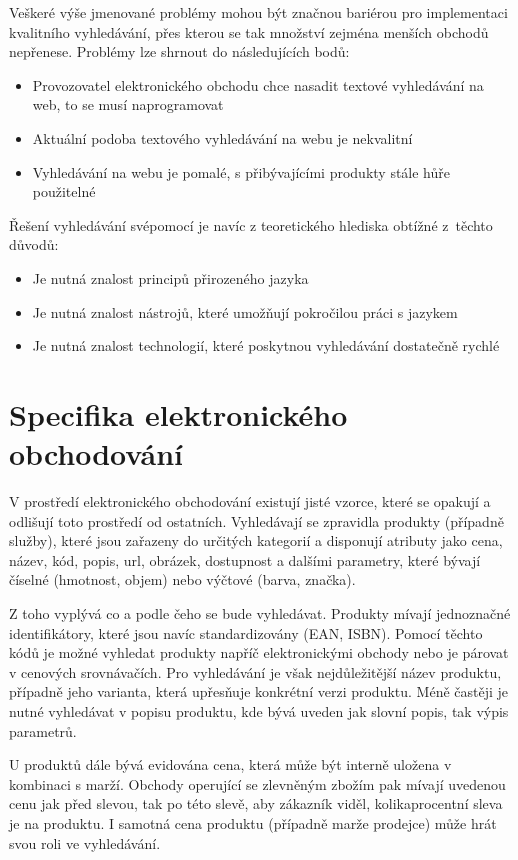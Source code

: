 \documentclass[FM,DP]{tulthesis}
\begin{document}
Veškeré výše jmenované problémy mohou být značnou bariérou pro implementaci kvalitního vyhledávání, 
přes kterou se tak množství zejména menších obchodů nepřenese. Problémy lze shrnout do následujících bodů:

\begin{itemize}
\item Provozovatel elektronického obchodu chce nasadit textové vyhledávání na web, to se musí naprogramovat
\item Aktuální podoba textového vyhledávání na webu je nekvalitní
\item Vyhledávání na webu je pomalé, s přibývajícími produkty stále hůře použitelné
\end{itemize}

Řešení vyhledávání svépomocí je navíc z teoretického hlediska obtížné z~těchto důvodů:

\begin{itemize}
\item Je nutná znalost principů přirozeného jazyka
\item Je nutná znalost nástrojů, které umožňují pokročilou práci s jazykem
\item Je nutná znalost technologií, které poskytnou vyhledávání dostatečně rychlé
\end{itemize}

\section{Specifika elektronického obchodování}

V prostředí elektronického obchodování existují jisté vzorce, které se opakují a odlišují
toto prostředí od ostatních. Vyhledávají se zpravidla produkty (případně služby), které jsou
zařazeny do určitých kategorií a disponují atributy jako cena, název, kód, popis, url, obrázek, 
dostupnost a dalšími parametry, které bývají číselné (hmotnost, objem) nebo výčtové (barva, značka). 

Z toho vyplývá co a podle čeho se bude vyhledávat. Produkty mívají jednoznačné identifikátory, 
které jsou navíc standardizovány (EAN, ISBN). Pomocí těchto kódů je možné vyhledat produkty
napříč elektronickými obchody nebo je párovat v cenových srovnávačích. Pro vyhledávání
je však nejdůležitější název produktu, případně jeho varianta, která upřesňuje konkrétní
verzi produktu. Méně častěji je nutné vyhledávat v popisu produktu, kde bývá uveden
jak slovní popis, tak výpis parametrů. 

U produktů dále bývá evidována cena, která může být interně uložena v kombinaci s marží.
Obchody operující se zlevněným zbožím pak mívají uvedenou cenu jak před slevou, tak po této
slevě, aby zákazník viděl, kolikaprocentní sleva je na produktu. I samotná cena produktu
(případně marže prodejce) může hrát svou roli ve vyhledávání.
\end{document}
